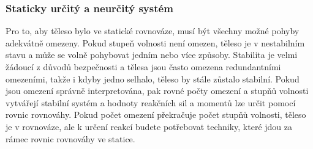 \documentclass[letterpaper,10pt,english]{jupyterBook}
\begin{document}
\subsubsection{Staticky určitý a neurčitý systém}
\label{\detokenize{Prednasky/1_1_Stupe_u0148_volnosti:staticky-urcity-a-neurcity-system}}
\sphinxAtStartPar
Pro to, aby těleso bylo ve statické rovnováze, musí být všechny možné pohyby adekvátně omezeny. Pokud stupeň volnosti není omezen, těleso je v nestabilním stavu a může se volně pohybovat jedním nebo více způsoby. Stabilita je velmi žádoucí z důvodů bezpečnosti a tělesa jsou často omezena redundantními omezeními, takže i kdyby jedno selhalo, těleso by stále zůstalo stabilní.  Pokud jsou omezení správně interpretována, pak rovné počty omezení a stupňů volnosti vytvářejí stabilní systém a hodnoty reakčních sil a momentů lze určit pomocí rovnic rovnováhy. Pokud počet omezení překračuje počet stupňů volnosti, těleso je v rovnováze, ale k určení reakcí budete potřebovat techniky, které jdou za rámec rovnic rovnováhy ve statice.
\end{document}
